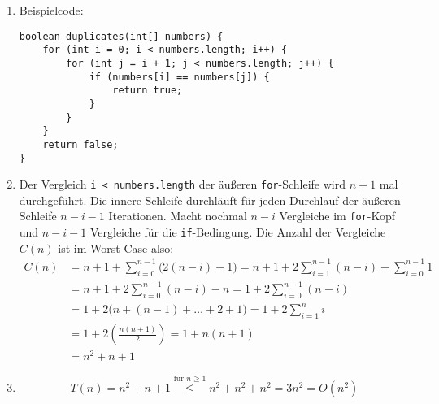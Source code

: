 \documentclass[11pt,a4paper]{article}
\begin{document}
\begin{loesung}
    
\begin{enumerate}
    \item Beispielcode:\\
    \begin{minipage}{\linewidth}
    \begin{lstlisting}
boolean duplicates(int[] numbers) {
    for (int i = 0; i < numbers.length; i++) {
        for (int j = i + 1; j < numbers.length; j++) {
            if (numbers[i] == numbers[j]) {
                return true;
            }
        }
    }
    return false;
}
    \end{lstlisting}
    \end{minipage}

    \item
    Der Vergleich \texttt{i < numbers.length} der äußeren \texttt{for}-Schleife wird $n + 1$ mal durchgeführt.
    Die innere Schleife durchläuft für jeden Durchlauf der äußeren Schleife $n - i - 1$ Iterationen. Macht nochmal $n - i$ Vergleiche im \glqq{}\texttt{for}-Kopf\grqq{} und $n - i - 1$ Vergleiche für die \texttt{if}-Bedingung. Die Anzahl der Vergleiche $C(n)$ ist im Worst Case also:
    \begin{align}
        C(n) &= n + 1 + \sum\limits_{i = 0}^{n - 1} \big(2(n - i) - 1 \big)
        = n + 1 + 2\sum\limits_{i = 1}^{n - 1}(n - i) - \sum\limits_{i = 0}^{n - 1} 1 \\
        &= n + 1 + 2\sum\limits_{i = 0}^{n - 1} (n - i) - n 
        =1 + 2\sum\limits_{i = 0}^{n - 1} (n - i) \\
        &= 1 + 2\big(n + (n-1) + \ldots + 2 + 1\big) = 1 + 2\sum\limits_{i = 1}^{n} i \\
        &= 1 + 2\left( \frac{n(n + 1)}{2} \right) = 1 + n(n+1) \\
        &= n^2 + n + 1
    \end{align}

    \item 
    \begin{equation}
        T(n) = n^2 + n + 1 \overset{\text{für }n \geq 1}{\leq} n^2 + n^2 + n^2 = 3 n^2 = O(n^2)
    \end{equation}
    

\end{enumerate}
\end{loesung}
\end{document}
